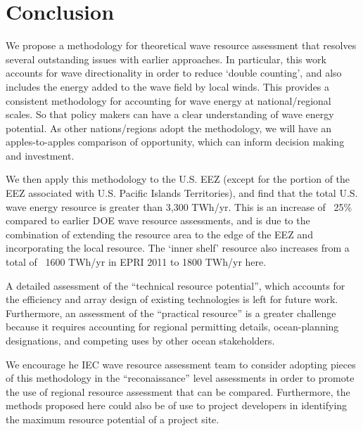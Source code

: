 \section{Conclusion} \label{sec:conclusion}

We propose a methodology for theoretical wave resource assessment that resolves several outstanding issues with earlier approaches. In particular, this work accounts for wave directionality in order to reduce `double counting', and also includes the energy added to the wave field by local winds. This provides a consistent methodology for accounting for wave energy at national/regional scales. So that policy makers can have a clear understanding of wave energy potential. As other nations/regions adopt the methodology, we will have an apples-to-apples comparison of opportunity, which can inform decision making and investment.

We then apply this methodology to the U.S. EEZ (except for the portion of the EEZ associated with U.S. Pacific Islands Territories), and find that the total U.S. wave energy resource is greater than 3,300 TWh/yr.
This is an increase of ~25\% compared to earlier DOE wave resource assessments, and is due to the combination of extending the resource area to the edge of the EEZ and incorporating the local resource. The `inner shelf' resource also increases from a total of ~1600 TWh/yr in EPRI 2011 to 1800 TWh/yr here. 

A detailed assessment of the ``technical resource potential'', which accounts for the efficiency and array design of existing technologies is left for future work. Furthermore, an assessment of the ``practical resource'' is a greater challenge because it requires accounting for regional permitting details, ocean-planning designations, and competing uses by other ocean stakeholders.

We encourage he IEC wave resource assessment team to consider adopting pieces of this methodology in the ``reconaissance'' level assessments in order to promote the use of regional resource assessment that can be compared. Furthermore, the methods proposed here could also be of use to project developers in identifying the maximum resource potential of a project site. 


